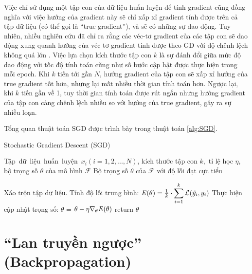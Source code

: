 Việc chỉ sử dụng một tập con của dữ liệu huấn luyện để tính gradient cũng đồng nghĩa với việc hướng của gradient này sẽ chỉ xấp xỉ gradient tính được trên cả tập dữ liệu (có thể gọi là ``true gradient''), và sẽ có những sự dao động. Tuy nhiên, nhiều nghiên cứu đã chỉ ra rằng các véc-tơ gradient của các tập con sẽ dao động xung quanh hướng của véc-tơ gradient tính được theo GD với độ chênh lệch không quá lớn \cite{bottou2010large}\cite{bottou2018optimization}. Việc lựa chọn kích thước tập con $k$ là sự đánh đổi giữa mức độ dao động với tốc độ tính toán cũng như số bước cập hật được thực hiện trong mỗi epoch. Khi $k$ tiến tới gần $N$, hướng gradient của tập con sẽ xấp xỉ hướng của true gradient tốt hơn, nhưng lại mất nhiều thời gian tính toán hơn. Ngược lại, khi $k$ tiến gần về 1, tuy thời gian tính toán được rút ngắn nhưng hướng gradient của tập con càng chênh lệch nhiều so với hướng của true gradient, gây ra sự nhiễu loạn.

Tổng quan thuật toán SGD được trình bày trong thuật toán \ref{alg:SGD}.

\begin{algorithm}
	\caption{Stochastic Gradient Descent (SGD)} \label{alg:SGD}
	\begin{algorithmic}[1]
		\renewcommand{\algorithmicrequire}{\textbf{Đầu vào:}}
		\renewcommand{\algorithmicensure}{\textbf{Đầu ra:}}
		\algnewcommand{}
		\algnewcommand\Operation{\item[\algorithmicoperation]}

		\Require Tập dữ liệu huấn luyện $x_i (i = 1, 2, ..., N)$, kích thước tập con $k$, tỉ lệ học $\eta$, bộ trọng số $\theta$ của mô hình $\mathcal{F}$
		\Ensure Bộ trọng số $\theta$ của $\mathcal{F}$ với độ lỗi đạt cực tiểu

		\Operation
			\State Xáo trộn tập dữ liệu.
				\State Tính độ lỗi trung bình: $\mathbf{\it{E}(\theta)} = \frac{1}{k}\cdot \displaystyle\sum_{i=1}^{k}\mathcal{L}(\hat{y_i}, y_i)$
				\State Thực hiện cập nhật trọng số: $\theta$ = $\theta - \eta \nabla_{\theta} \mathbf{\it{E}(\theta)}$
			\EndFor
		\EndWhile
		\State return $\theta$
	\end{algorithmic}
\end{algorithm}

\section{``Lan truyền ngược'' (Backpropagation)}

